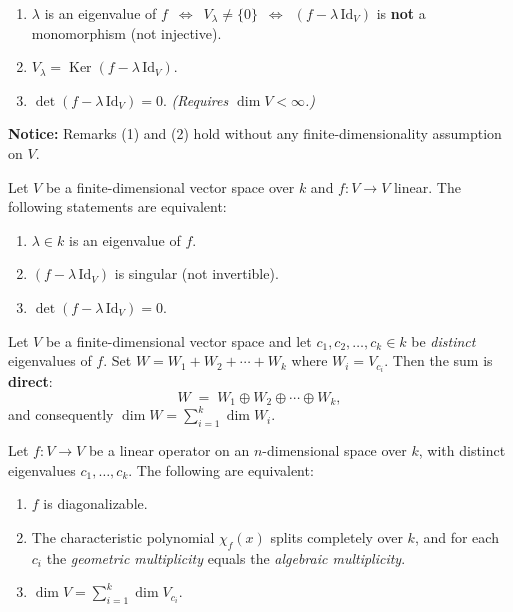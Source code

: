 \begin{tipbox}
\begin{enumerate}[leftmargin=1.5em, itemsep=3pt]
  \item $\lambda$ is an eigenvalue of $f$
        \,$\iff$\, $V_\lambda \neq \{0\}$
        \,$\iff$\, $(f - \lambda\,\mathrm{Id}_V)$ is \textbf{not} a monomorphism
        (not injective).
  \item $V_\lambda = \operatorname{Ker}(f - \lambda\,\mathrm{Id}_V)$.
  \item $\det(f - \lambda\,\mathrm{Id}_V) = 0$.
        \quad\textit{(Requires $\dim V < \infty$.)}
\end{enumerate}
\textbf{Notice:} Remarks (1) and (2) hold without any finite-dimensionality
assumption on $V$.
\end{tipbox}

\begin{thmbox}
Let $V$ be a finite-dimensional vector space over $k$ and
$f: V \to V$ linear.  The following statements are equivalent:
\begin{enumerate}[leftmargin=1.5em, itemsep=3pt]
  \item $\lambda \in k$ is an eigenvalue of $f$.
  \item $(f - \lambda\,\mathrm{Id}_V)$ is singular (not invertible).
  \item $\det(f - \lambda\,\mathrm{Id}_V) = 0$.
\end{enumerate}
\end{thmbox}

\begin{thmbox}
Let $V$ be a finite-dimensional vector space and let
$c_1, c_2, \ldots, c_k \in k$ be \emph{distinct} eigenvalues of
$f$.  Set $W = W_1 + W_2 + \cdots + W_k$ where $W_i = V_{c_i}$.  Then
the sum is \textbf{direct}:
\[
  W \;=\; W_1 \oplus W_2 \oplus \cdots \oplus W_k,
\]
and consequently $\dim W = \sum\limits_{i=1}^{k} \dim W_i$.
\end{thmbox}

\begin{thmbox}
Let $f: V \to V$ be a linear operator on an $n$-dimensional space over
$k$, with distinct eigenvalues $c_1, \ldots, c_k$.  The following
are equivalent:
\begin{enumerate}[leftmargin=1.5em, itemsep=3pt]
  \item $f$ is diagonalizable.
  \item The characteristic polynomial $\chi_f(x)$ splits completely over
        $k$, and for each $c_i$ the \emph{geometric multiplicity}
        equals the \emph{algebraic multiplicity}.
  \item $\dim V = \sum\limits_{i=1}^{k} \dim V_{c_i}$.
\end{enumerate}
\end{thmbox}

